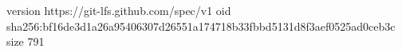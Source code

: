 version https://git-lfs.github.com/spec/v1
oid sha256:bf16de3d1a26a95406307d26551a174718b33fbbd5131d8f3aef0525ad0ceb3c
size 791
